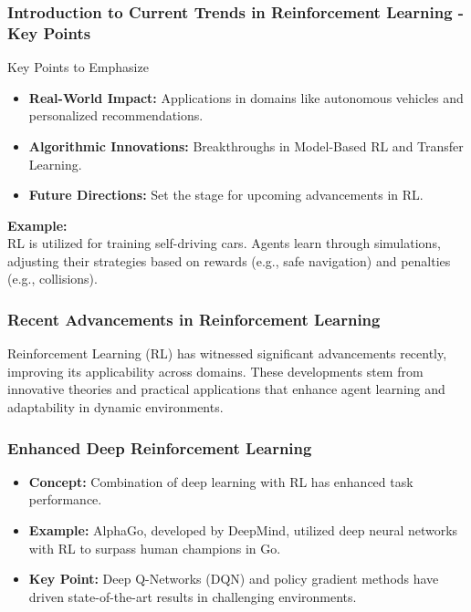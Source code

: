 \documentclass{beamer}
\begin{document}
\begin{frame}[fragile]
    \frametitle{Introduction to Current Trends in Reinforcement Learning - Key Points}
    \begin{block}{Key Points to Emphasize}
        \begin{itemize}
            \item \textbf{Real-World Impact:} Applications in domains like autonomous vehicles and personalized recommendations.
            \item \textbf{Algorithmic Innovations:} Breakthroughs in Model-Based RL and Transfer Learning.
            \item \textbf{Future Directions:} Set the stage for upcoming advancements in RL.
        \end{itemize}
    \end{block}
    \begin{example}
        \textbf{Example:} \\
        RL is utilized for training self-driving cars. Agents learn through simulations, adjusting their strategies based on rewards (e.g., safe navigation) and penalties (e.g., collisions).
    \end{example}
\end{frame}

\begin{frame}[fragile]
    \frametitle{Recent Advancements in Reinforcement Learning}
    Reinforcement Learning (RL) has witnessed significant advancements recently, improving its applicability across domains. These developments stem from innovative theories and practical applications that enhance agent learning and adaptability in dynamic environments.
\end{frame}

\begin{frame}[fragile]
    \frametitle{Enhanced Deep Reinforcement Learning}
    \begin{itemize}
        \item \textbf{Concept:} Combination of deep learning with RL has enhanced task performance.
        \item \textbf{Example:} AlphaGo, developed by DeepMind, utilized deep neural networks with RL to surpass human champions in Go.
        \item \textbf{Key Point:} Deep Q-Networks (DQN) and policy gradient methods have driven state-of-the-art results in challenging environments.
    \end{itemize}
\end{frame}
\end{document}

